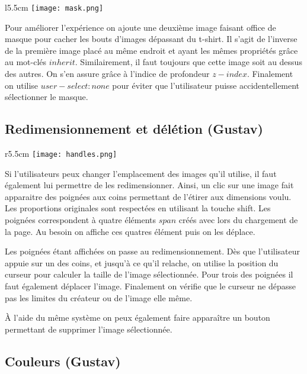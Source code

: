 \documentclass[french]{article}
\begin{document}
\begin{wrapfigure}{l}{5.5cm}
\texttt{[image: mask.png]}
\end{wrapfigure} 

Pour améliorer l'expérience on ajoute une deuxième image faisant office de masque pour cacher les bouts d'images dépassant du t-shirt. Il s'agit de l'inverse de la première image placé au même endroit et ayant les mêmes propriétés grâce au mot-clés $inherit$. Similairement, il faut toujours que cette image soit au dessus des autres. On s'en assure grâce à l'indice de profondeur $z-index$. Finalement on utilise $user-select: none$ pour éviter que l'utilisateur puisse accidentellement sélectionner le masque.

\clearpage
\newpage

\subsection{Redimensionnement et délétion (Gustav)}

\begin{wrapfigure}{r}{5.5cm}
\texttt{[image: handles.png]}
\end{wrapfigure} 

Si l'utilisateurs peux changer l'emplacement des images qu'il utilise, il faut également lui permettre de les redimensionner. Ainsi, un clic sur une image fait apparaitre des poignées aux coins permettant de l'étirer aux dimensions voulu. Les proportions originales sont respectées en utilisant la touche shift. Les poignées correspondent à quatre éléments $span$ créés avec lors du chargement de la page. Au besoin on affiche ces quatres élément puis on les déplace.

Les poignées étant affichées on passe au redimensionnement. Dès que l'utilisateur appuie sur un des coins, et jusqu'à ce qu'il relache, on utilise la position du curseur pour calculer la taille de l'image sélectionnée. Pour trois des poignées il faut également déplacer l'image. Finalement on vérifie que le curseur ne dépasse pas les limites du créateur ou de l'image elle même.

\`{A} l'aide du même système on peux également faire apparaître un bouton permettant de supprimer l'image sélectionnée. 

\subsection{Couleurs (Gustav)}
\end{document}
